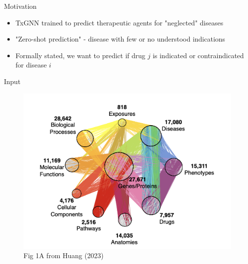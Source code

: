 \documentclass{beamer}
\begin{document}
\begin{frame}{Motivation}
    \begin{itemize}\setlength\itemsep{6mm}
        \item TxGNN trained to predict therapeutic agents for "neglected" diseases 
        \item "Zero-shot prediction" - disease with few or no understood indications 
        \item Formally stated, we want to predict if drug $j$ is indicated or contraindicated for disease $i$
    \end{itemize}
\end{frame}


\begin{frame}{Input}
    \begin{figure}
        \centering 
        \includegraphics{txGNN_KG.png}
        \caption{Fig 1A from Huang (2023) \cite{huang_zero-shot_2023}}
    \end{figure}
\end{frame}
\end{document}
